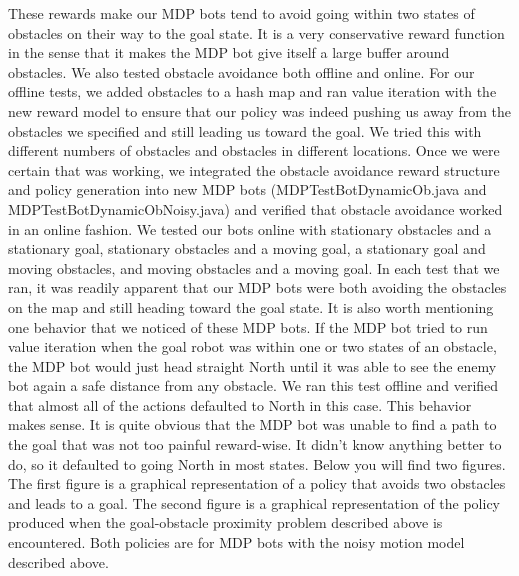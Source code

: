 \documentclass{aiaa-tc}%
\begin{document}
These rewards make our MDP bots tend to avoid going within two states of obstacles on their way to the goal state. It is a very conservative reward function in the sense that it makes the MDP bot give itself a large buffer around obstacles. We also tested obstacle avoidance both offline and online. For our offline tests, we added obstacles to a hash map and ran value iteration with the new reward model to ensure that our policy was indeed pushing us away from the obstacles we specified and still leading us toward the goal. We tried this with different numbers of obstacles and obstacles in different locations. Once we were certain that was working, we integrated the obstacle avoidance reward structure and policy generation into new MDP bots (MDPTestBotDynamicOb.java and MDPTestBotDynamicObNoisy.java) and verified that obstacle avoidance worked in an online fashion. We tested our bots online with stationary obstacles and a stationary goal, stationary obstacles and a moving goal, a stationary goal and moving obstacles, and moving obstacles and a moving goal. In each test that we ran, it was readily apparent that our MDP bots were both avoiding the obstacles on the map and still heading toward the goal state. It is also worth mentioning one behavior that we noticed of these MDP bots. If the MDP bot tried to run value iteration when the goal robot was within one or two states of an obstacle, the MDP bot would just head straight North until it was able to see the enemy bot again a safe distance from any obstacle. We ran this test offline and verified that almost all of the actions defaulted to North in this case. This behavior makes sense. It is quite obvious that the MDP bot was unable to find a path to the goal that was not too painful reward-wise. It didn't know anything better to do, so it defaulted to going North in most states. Below you will find two figures. The first figure is a graphical representation of a policy that avoids two obstacles and leads to a goal. The second figure is a graphical representation of the policy produced when the goal-obstacle proximity problem described above is encountered. Both policies are for MDP bots with the noisy motion model described above.
\end{document}
